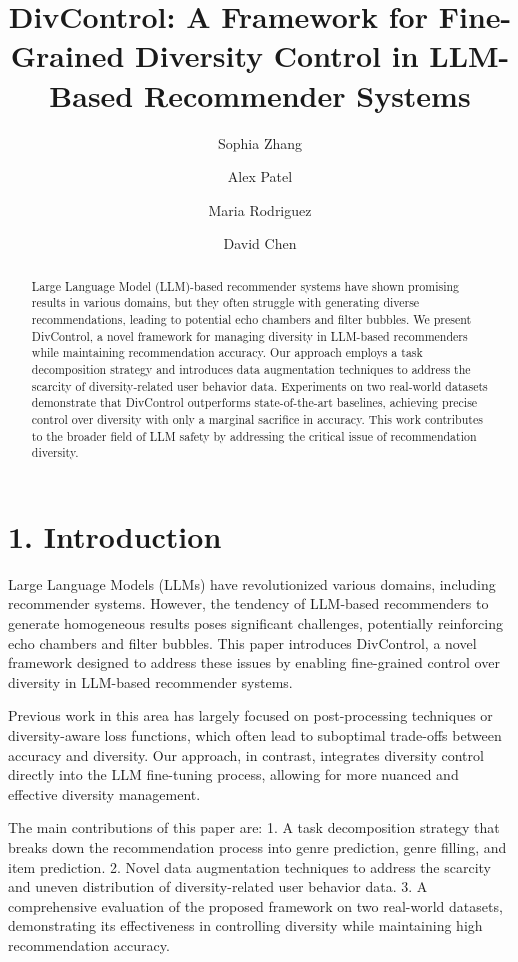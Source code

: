 \documentclass[10pt,twocolumn,letterpaper]{article}
\title{DivControl: A Framework for Fine-Grained Diversity Control in LLM-Based Recommender Systems}
\author{Sophia Zhang \and Alex Patel \and Maria Rodriguez \and David Chen}
\begin{document}
\maketitle

\begin{abstract}
Large Language Model (LLM)-based recommender systems have shown promising results in various domains, but they often struggle with generating diverse recommendations, leading to potential echo chambers and filter bubbles. We present DivControl, a novel framework for managing diversity in LLM-based recommenders while maintaining recommendation accuracy. Our approach employs a task decomposition strategy and introduces data augmentation techniques to address the scarcity of diversity-related user behavior data. Experiments on two real-world datasets demonstrate that DivControl outperforms state-of-the-art baselines, achieving precise control over diversity with only a marginal sacrifice in accuracy. This work contributes to the broader field of LLM safety by addressing the critical issue of recommendation diversity.
\end{abstract}

\section{1. Introduction}

Large Language Models (LLMs) have revolutionized various domains, including recommender systems. However, the tendency of LLM-based recommenders to generate homogeneous results poses significant challenges, potentially reinforcing echo chambers and filter bubbles. This paper introduces DivControl, a novel framework designed to address these issues by enabling fine-grained control over diversity in LLM-based recommender systems.

Previous work in this area has largely focused on post-processing techniques or diversity-aware loss functions, which often lead to suboptimal trade-offs between accuracy and diversity. Our approach, in contrast, integrates diversity control directly into the LLM fine-tuning process, allowing for more nuanced and effective diversity management.

The main contributions of this paper are:
1. A task decomposition strategy that breaks down the recommendation process into genre prediction, genre filling, and item prediction.
2. Novel data augmentation techniques to address the scarcity and uneven distribution of diversity-related user behavior data.
3. A comprehensive evaluation of the proposed framework on two real-world datasets, demonstrating its effectiveness in controlling diversity while maintaining high recommendation accuracy.
\end{document}
